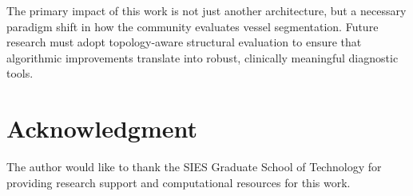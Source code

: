 \documentclass[conference]{IEEEtran}
\begin{document}
The primary impact of this work is not just another architecture, but a necessary paradigm shift in how the community evaluates vessel segmentation. Future research must adopt topology-aware structural evaluation to ensure that algorithmic improvements translate into robust, clinically meaningful diagnostic tools.

\section*{Acknowledgment}
The author would like to thank the SIES Graduate School of Technology for providing research support and computational resources for this work.

\nocite{*}


\end{document}
